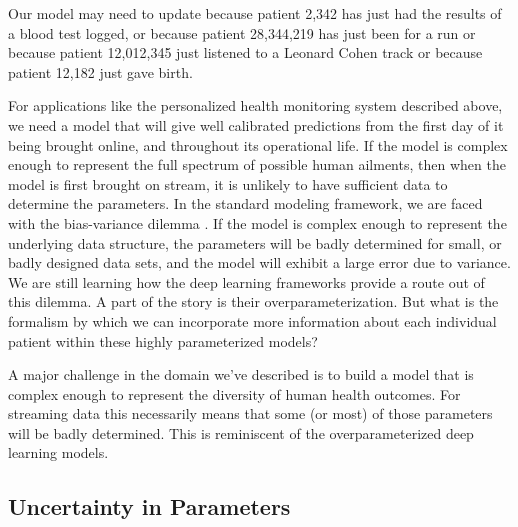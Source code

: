 \documentclass[a4paperpaper,]{article}
\begin{document}
Our model may need to update because patient 2,342 has just had the
results of a blood test logged, or because patient 28,344,219 has just
been for a run or because patient 12,012,345 just listened to a Leonard
Cohen track or because patient 12,182 just gave birth.

For applications like the personalized health monitoring system
described above, we need a model that will give well calibrated
predictions from the first day of it being brought online, and
throughout its operational life. If the model is complex enough to
represent the full spectrum of possible human ailments, then when the
model is first brought on stream, it is unlikely to have sufficient data
to determine the parameters. In the standard modeling framework, we are
faced with the bias-variance dilemma \citep{Geman:bias92}. If the model
is complex enough to represent the underlying data structure, the
parameters will be badly determined for small, or badly designed data
sets, and the model will exhibit a large error due to variance. We are
still learning how the deep learning frameworks provide a route out of
this dilemma. A part of the story is their overparameterization. But
what is the formalism by which we can incorporate more information about
each individual patient within these highly parameterized models?

A major challenge in the domain we've described is to build a model that
is complex enough to represent the diversity of human health outcomes.
For streaming data this necessarily means that some (or most) of those
parameters will be badly determined. This is reminiscent of the
overparameterized deep learning models.

\hypertarget{uncertainty-in-parameters}{%
\subsection{Uncertainty in
Parameters}\label{uncertainty-in-parameters}}
\end{document}
